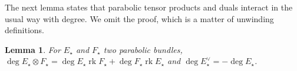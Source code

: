 \documentclass[12 pt]{amsart}
\theoremstyle{plain}
\newtheorem{lemma}[subsubsection]{Lemma}
\theoremstyle{definition}
\theoremstyle{remark}
\numberwithin{equation}{section}
\DeclareMathOperator\rk{rk}
\begin{document}
The next lemma states that parabolic tensor products and duals interact in the usual way with degree.
We omit the proof, which is a matter of unwinding definitions.
\begin{lemma}
	\label{lemma:degree-in-duals}
	For $E_\star$ and $F_\star$ two parabolic bundles, $\deg E_\star \otimes
	F_\star= \deg E_\star \rk F_\star + \deg F_\star \rk E_\star$ and $\deg
	E_\star^\vee = - \deg E_\star$.
\end{lemma}
%
\end{document}

